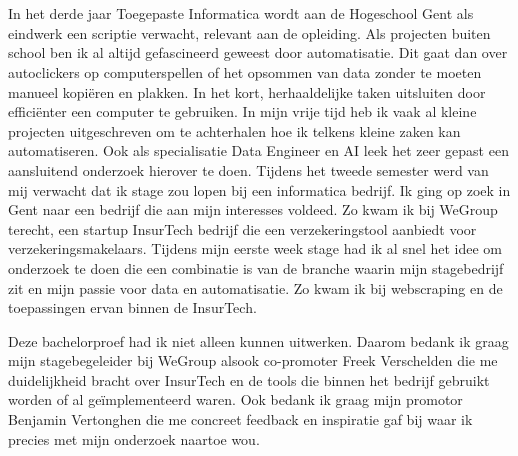 
\chapter*{}
\label{ch:voorwoord}

In het derde jaar Toegepaste Informatica wordt aan de Hogeschool Gent als eindwerk een scriptie verwacht, relevant aan de opleiding. Als projecten buiten school ben ik al altijd gefascineerd geweest door automatisatie. Dit gaat dan over autoclickers op computerspellen of het opsommen van data zonder te moeten manueel kopiëren en plakken. In het kort, herhaaldelijke taken uitsluiten door efficiënter een computer te gebruiken. In mijn vrije tijd heb ik vaak al kleine projecten uitgeschreven om te achterhalen hoe ik telkens kleine zaken kan automatiseren. Ook als specialisatie Data Engineer en AI leek het zeer gepast een aansluitend onderzoek hierover te doen. Tijdens het tweede semester werd van mij verwacht dat ik stage zou lopen bij een informatica bedrijf. Ik ging op zoek in Gent naar een bedrijf die aan mijn interesses voldeed. Zo kwam ik bij WeGroup terecht, een startup InsurTech bedrijf die een verzekeringstool aanbiedt voor verzekeringsmakelaars. Tijdens mijn eerste week stage had ik al snel het idee om onderzoek te doen die een combinatie is van de branche waarin mijn stagebedrijf zit en mijn passie voor data en automatisatie. Zo kwam ik bij webscraping en de toepassingen ervan binnen de InsurTech.

Deze bachelorproef had ik niet alleen kunnen uitwerken. Daarom bedank ik graag mijn stagebegeleider bij WeGroup alsook co-promoter Freek Verschelden die me duidelijkheid bracht over InsurTech en de tools die binnen het bedrijf gebruikt worden of al geïmplementeerd waren.
Ook bedank ik graag mijn promotor Benjamin Vertonghen die me concreet feedback en inspiratie gaf bij waar ik precies met mijn onderzoek naartoe wou.

